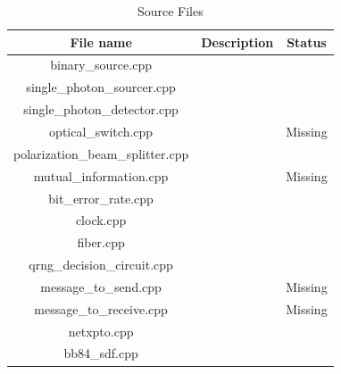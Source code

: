 \begin{table}[hbt]
\centering
\caption{Source Files}
\label{tb:signals}
\begin{tabular}{|c|c|c|}
\hline
\textbf{File name}              & \textbf{Description} & \textbf{Status} \\ \hline
binary\_source.cpp       &                      &                 \\ \hline
single\_photon\_sourcer.cpp      &                      &                 \\ \hline
single\_photon\_detector.cpp       &                      &                 \\ \hline
optical\_switch.cpp                       &                      &   Missing              \\ \hline
polarization\_beam\_splitter.cpp                       &                      &                 \\ \hline
mutual\_information.cpp            &                      &       Missing          \\ \hline
bit\_error\_rate.cpp            &                      &                 \\ \hline
clock.cpp            &                      &                 \\ \hline
fiber.cpp            &                      &                 \\ \hline
qrng\_decision\_circuit.cpp            &                      &                 \\ \hline
message\_to\_send.cpp               &                      &       Missing          \\ \hline
message\_to\_receive.cpp            &                      &       Missing          \\ \hline
netxpto.cpp                       &                      &                 \\ \hline
bb84\_sdf.cpp                       &                      &                 \\ \hline
\end{tabular}
\end{table} 